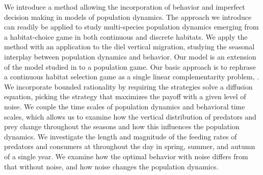 We introduce a method allowing the incorporation of behavior and imperfect decision making in models of population dynamics. The approach we introduce can readily be applied to study multi-species population dynamics emerging from a habitat-choice game in both continuous and discrete habitats. We apply the method with an application to the diel vertical migration, studying the seasonal interplay between population dynamics and behavior. Our model is an extension of the model studied in \citep{verticalmigration} to a population game. Our basic approach is to rephrase a continuous habitat selection game as a single linear complementarity problem, \citep{miller1991copositive}. We incorporate bounded rationality by requiring the strategies solve a diffusion equation, picking the strategy that maximizes the payoff with a given level of noise.
We couple the time scales of population dynamics and behavioral time scales, which allows us to examine how the vertical distribution of predators and prey change throughout the seasons and how this influences the population dynamics. We investigate the length and magnitude of the feeding rates of predators and consumers at throughout the day in spring, summer, and autumn of a single year. We examine how the optimal behavior with noise differs from that without noise, and how noise changes the population dynamics.

